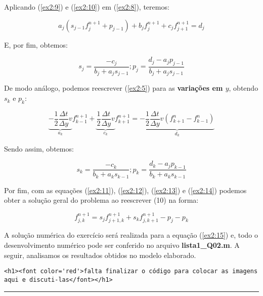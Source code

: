 \documentclass[11pt]{article}
\begin{document}
Aplicando (\ref{ex2:9}) e (\ref{ex2:10}) em (\ref{ex2:8}), teremos:

\begin{equation}
    a_j(s_{j-1}f^{n+1}_{j} + p_{j-1}) + b_jf^{n+1}_{j} + c_jf^{n+1}_{j+1} = d_j
    \label{ex2:11}
\end{equation}

E, por fim, obtemos:

\begin{equation}
    s_j = \frac{-c_j}{b_j + a_js_{j-1}}; p_j = \frac{d_j - a_jp_{j-1}}{b_j + a_js_{j-1}}
    \label{ex2:12}
\end{equation}

De modo análogo, podemos reescrever (\ref{ex2:5}) para as
\textbf{variações em \(y\)}, obtendo \(s_k\) e \(p_k\):

\begin{equation}
    \underbrace{-\frac{1}{2}\frac{\Delta{t}}{\Delta{y}}v}_{a_k}f^{n+1}_{k-1} +
    \underbrace{\frac{1}{2}\frac{\Delta{t}}{\Delta{y}}v}_{c_k}f^{n+1}_{k+1}  =
    \underbrace{-\frac{1}{2}\frac{\Delta{t}}{\Delta{y}}v(f^{n}_{k+1} - f^{n}_{k-1})}_{d_k}
    \label{ex2:13}
\end{equation}

Sendo assim, obtemos:

\begin{equation}
    s_k = \frac{-c_k}{b_k + a_ks_{k-1}}; p_k = \frac{d_k - a_jp_{k-1}}{b_k + a_ks_{k-1}}
    \label{ex2:14}
\end{equation}

Por fim, com as equações (\ref{ex2:11}), (\ref{ex2:12}), (\ref{ex2:13})
e (\ref{ex2:14}) podemos obter a solução geral do problema ao reescrever
(10) na forma:

\begin{equation}
    f^{n+1}_{j,k} = s_{j}f^{n+1}_{j+1,k} + s_{k}f^{n+1}_{j,k+1}- p_{j} - p_{k}
    \label{ex2:15}
\end{equation}

A solução numérica do exercício será realizada para a equação
(\ref{ex2:15}) e, todo o desenvolvimento numérico pode ser conferido no
arquivo \textbf{lista1\_Q02.m}. A seguir, analisamos os resultados
obtidos no modelo elaborado.

\begin{verbatim}
<h1><font color='red'>falta finalizar o código para colocar as imagens aqui e discuti-las</font></h1>
\end{verbatim}

    \begin{center}\rule{0.5\linewidth}{\linethickness}\end{center}
\end{document}

